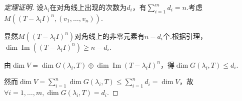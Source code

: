\begin{proof}[定理证明]
    设\(\lambda_i\)在对角线上出现的次数为\(d_i\)，有\(\sum_{i=1}^m d_i=n\).考虑\(M((T-\lambda_i I)^n, (v_1, \dots, v_n))\).

    显然\(M((T-\lambda_i I)^n)\)对角线上的非零元素有\(n-d_i\)个.根据引理，\(\dim \operatorname{Im} ((T-\lambda_i I)^n) \geq n-d_i\).

    由\(\dim V=\dim G(\lambda_i,T) \oplus \dim \operatorname{Im}(T-\lambda_i I)^n\)，得\(\dim G(\lambda_i,T) \leq d_i\).

    然而\(\dim V=\sum_{i=1}^n \dim G(\lambda_i,T) \leq \sum_{i=1}^n d_i=\dim V\)，故\(\forall i=1, \dots, m, \dim G(\lambda_i,T)=d_i\).
\end{proof}

